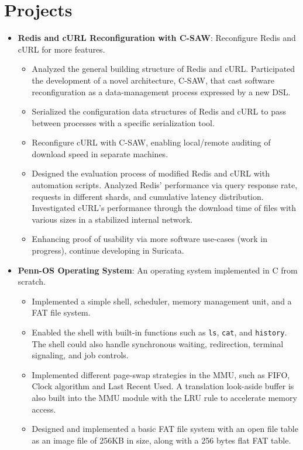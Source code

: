 \documentclass[a4paper]{article}
\newcommand{\resumeItem}[2]{
  \item\small{
    \textbf{#1}{: #2 \vspace{-2pt}}
  }
}
\newcommand{\resumeSubItem}[2]{\resumeItem{#1}{#2}\vspace{-3pt}}
\newcommand{\resumeSubHeadingListStart}{\begin{itemize}[leftmargin=*]}
\newcommand{\resumeSubHeadingListEnd}{\end{itemize}}
\begin{document}
\vspace{-5pt}
\section{Projects}
\resumeSubHeadingListStart
\resumeSubItem{Redis and cURL Reconfiguration with C-SAW}{Reconfigure Redis and
  cURL for more features.}
\begin{itemize}
  \item Analyzed the general building structure of Redis and cURL. Participated
        the development of a novel architecture, C-SAW, that cast software
        reconfiguration as a data-management process expressed by a new DSL.
  \item Serialized the configuration data structures of Redis and cURL to pass
        between processes with a specific serialization tool.
  \item Reconfigure cURL with C-SAW, enabling local/remote auditing of download
        speed in separate machines.
  \item Designed the evaluation process of modified Redis and cURL with
        automation scripts. Analyzed Redis' performance via query response rate,
        requests in different shards, and cumulative latency distribution.
        Investigated cURL's performance through the download time of files with
        various sizes in a stabilized internal network.
  \item Enhancing proof of usability via more software use-cases (work in
        progress), continue developing in Suricata.
\end{itemize}

\vspace{2pt}
\resumeSubItem{Penn-OS Operating System}
{An operating system implemented in C from scratch.}
\begin{itemize}
  \item Implemented a simple shell, scheduler, memory management unit, and a FAT
        file system.
  \item Enabled the shell with built-in functions such as \texttt{ls},
        \texttt{cat}, and \texttt{history}. The shell could also handle
        synchronous waiting, redirection, terminal signaling, and job controls.
  \item Implemented different page-swap strategies in the MMU, such as FIFO,
        Clock algorithm and Last Recent Used. A translation look-aside buffer is
        also built into the MMU module with the LRU rule to accelerate memory
        access.
  \item Designed and implemented a basic FAT file system with an open file table
        as an image file of 256KB in size, along with a 256 bytes flat FAT
        table.
\end{itemize}
\resumeSubHeadingListEnd
\end{document}

